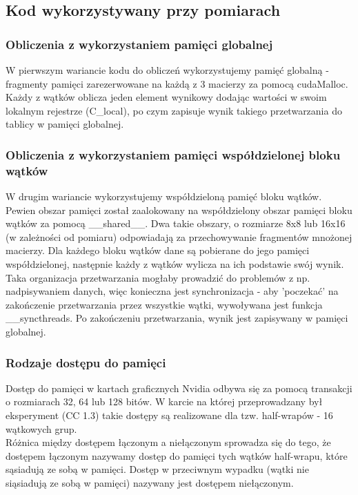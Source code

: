 \documentclass[10pt,a4paper]{article}
\begin{document}
\subsection{Kod wykorzystywany przy pomiarach}
\subsubsection*{Obliczenia z wykorzystaniem pamięci globalnej}
W pierwszym wariancie kodu do obliczeń wykorzystujemy pamięć globalną - fragmenty
pamięci zarezerwowane na każdą z 3 macierzy za pomocą cudaMalloc. Każdy z wątków
oblicza jeden element wynikowy dodając wartości w swoim lokalnym rejestrze (C\_local),
po czym zapisuje wynik takiego przetwarzania do tablicy w pamięci globalnej.

\subsubsection*{Obliczenia z wykorzystaniem pamięci współdzielonej bloku wątków}
W drugim wariancie wykorzystujemy współdzieloną pamięć bloku wątków. Pewien obszar
pamięci został zaalokowany na współdzielony obszar pamięci bloku wątków za pomocą
\_\_shared\_\_. Dwa takie obszary, o rozmiarze 8x8 lub 16x16 (w zależności od pomiaru)
odpowiadają za przechowywanie fragmentów mnożonej macierzy. Dla każdego bloku wątków
dane są pobierane do jego pamięci współdzielonej, następnie każdy z wątków wylicza
na ich podstawie swój wynik. \\
Taka organizacja przetwarzania mogłaby prowadzić do problemów z np. nadpisywaniem danych,
więc konieczna jest synchronizacja - aby 'poczekać' na zakończenie przetwarzania przez wszystkie wątki, wywoływana
jest funkcja \_\_syncthreads. Po zakończeniu przetwarzania, wynik jest zapisywany w
pamięci globalnej.


\subsubsection{Rodzaje dostępu do pamięci}
Dostęp do pamięci w kartach graficznych Nvidia odbywa się za pomocą transakcji o rozmiarach
32, 64 lub 128 bitów. W karcie na której przeprowadzany był eksperyment (CC 1.3) takie dostępy
są realizowane dla tzw. half-wrapów - 16 wątkowych grup. \\
Różnica między dostępem łączonym a niełączonym sprowadza się do tego, że
dostępem łączonym nazywamy dostęp do pamięci tych wątków half-wrapu, które
sąsiadują ze sobą w pamięci. Dostęp w przeciwnym wypadku (wątki nie siąsiadują ze sobą
w pamięci) nazywany jest dostępem niełączonym.
\end{document}
